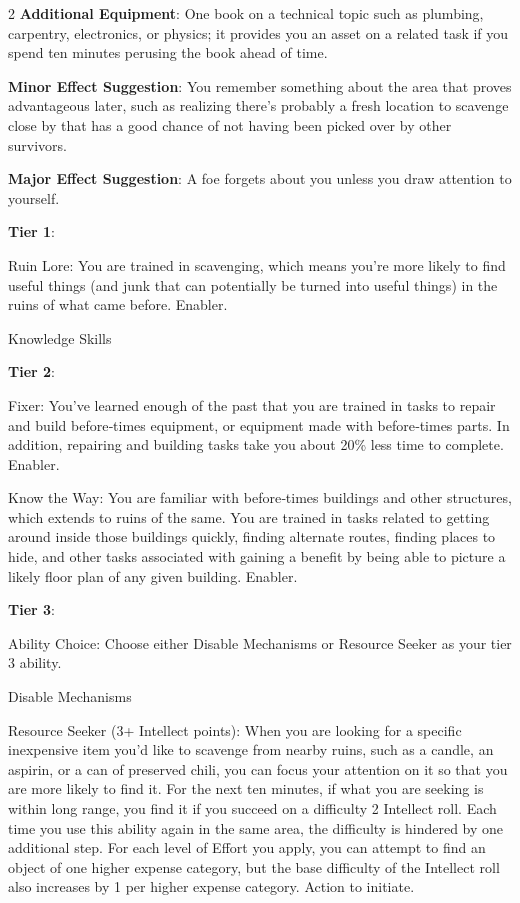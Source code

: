 \begin{multicols}{2}
\textbf{Additional Equipment}: One book on a technical topic such as plumbing, carpentry, electronics, or physics; it provides you an asset on a related task if you spend ten minutes perusing the book ahead of time.

\textbf{Minor Effect Suggestion}: You remember something about the area that proves advantageous later, such as realizing there’s probably a fresh location to scavenge close by that has a good chance of not having been picked over by other survivors.

\textbf{Major Effect Suggestion}: A foe forgets about you unless you draw attention to yourself.

\textbf{Tier 1}:

Ruin Lore: You are trained in scavenging, which means you’re more likely to find useful things (and junk that can potentially be turned into useful things) in the ruins of what came before. Enabler.

Knowledge Skills

\textbf{Tier 2}:

Fixer: You’ve learned enough of the past that you are trained in tasks to repair and build before‑times equipment, or equipment made with before‑times parts. In addition, repairing and building tasks take you about 20\% less time to complete. Enabler.

Know the Way: You are familiar with before‑times buildings and other structures, which extends to ruins of the same. You are trained in tasks related to getting around inside those buildings quickly, finding alternate routes, finding places to hide, and other tasks associated with gaining a benefit by being able to picture a likely floor plan of any given building. Enabler.

\textbf{Tier 3}:

Ability Choice: Choose either Disable Mechanisms or Resource Seeker as your tier 3 ability. 

Disable Mechanisms 

Resource Seeker (3+ Intellect points): When you are looking for a specific inexpensive item you’d like to scavenge from nearby ruins, such as a candle, an aspirin, or a can of preserved chili, you can focus your attention on it so that you are more likely to find it. For the next ten minutes, if what you are seeking is within long range, you find it if you succeed on a difficulty 2 Intellect roll. Each time you use this ability again in the same area, the difficulty is hindered by one additional step. For each level of Effort you apply, you can attempt to find an object of one higher expense category, but the base difficulty of the Intellect roll also increases by 1 per higher expense category. Action to initiate.


\end{multicols}
